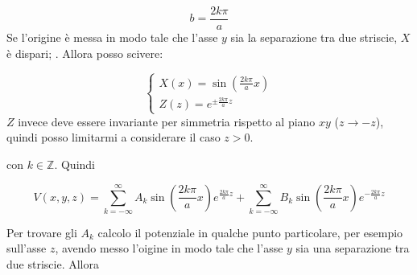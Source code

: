 \documentclass[../main.tex]{subfiles}
\begin{document}
\begin{equation}
  b=\frac{2k \pi}{a}
\end{equation}
Se l'origine \`e messa in modo tale che l'asse $y$ sia la separazione tra due striscie, $X$ \`e dispari; . Allora posso scivere:

\begin{equation}
  \left\{
    \begin{aligned}
      X(x)=\sin \left(\frac{2 k \pi}{a}x \right) \\
      Z(z)=e^{\pm \frac{2 k \pi}{a}z}
    \end{aligned}
  \right.
\end{equation}
$Z$ invece deve essere invariante per simmetria rispetto al piano $xy$ ($z \to -z$), quindi posso limitarmi a considerare il caso $z > 0$.

con $k\in \mathbb Z$. Quindi

\begin{equation}
  V(x,y,z)=\sum_{k=-\infty}^\infty A_k \sin \left(\frac{2 k \pi}{a}x \right) e^{\frac{2 k \pi}{a} z } + \sum_{k=-\infty}^\infty B_k \sin \left(\frac{2 k \pi}{a}x \right) e^{- \frac{2 k \pi}{a} z }
\end{equation}

Per trovare gli $A_k$ calcolo il potenziale in qualche punto particolare, per esempio sull'asse $z$, avendo messo l'oigine in modo tale che l'asse $y$ sia una separazione tra due striscie. Allora 
\end{document}
